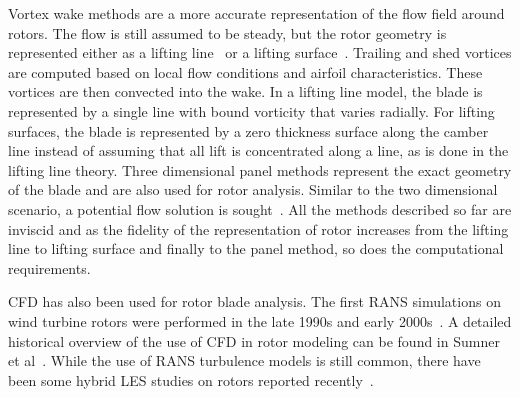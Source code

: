 Vortex wake methods are a more accurate representation of the flow field around rotors. The flow is still assumed to be steady, but the rotor geometry is represented either as a lifting line~\cite{awsm_arne} or a lifting surface~\cite{katz_plotkin_2001}. Trailing and shed vortices are computed based on local flow conditions and airfoil characteristics. These vortices are then convected into the wake. In a lifting line model, the blade is represented by a single line with bound vorticity that varies radially. For lifting surfaces, the blade is represented by a zero thickness surface along the camber line instead of assuming that all lift is concentrated along a line, as is done in the lifting line theory. Three dimensional panel methods represent the exact geometry of the blade and are also used for rotor analysis. Similar to the two dimensional scenario, a potential flow solution is sought~\cite{katz_plotkin_2001, arne_phd}.
All the methods described so far are inviscid and as the fidelity of the representation of rotor increases from the lifting line to lifting surface and finally to the panel method, so does the computational requirements. 

CFD has also been used for rotor blade analysis. The first RANS simulations on wind turbine rotors were performed in the late 1990s and early 2000s~\cite{duque2000numerical, sorensen1998rotor, varela1999cfd}. A detailed historical overview of the use of CFD in rotor modeling can be found in Sumner et al~\cite{sumner2010cfd}. While the use of RANS turbulence models is still common, there have been some hybrid LES studies on rotors reported recently~\cite{criticalreview}. 

